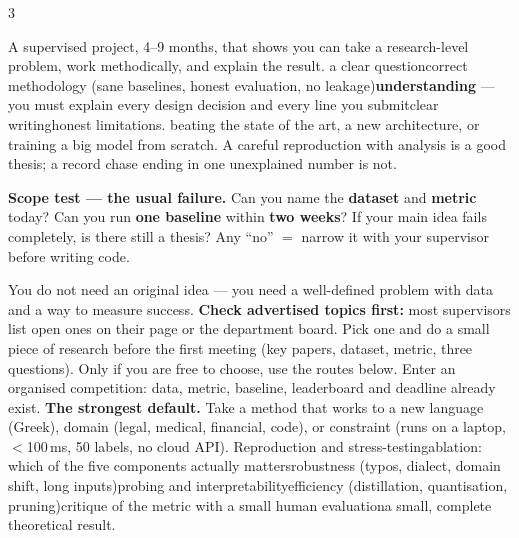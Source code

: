 \documentclass[10pt,a4paper]{article}
\begin{document}
\vspace{2pt}
\begin{multicols}{3}
\raggedcolumns
\raggedright

A supervised project, 4--9 months, that shows you can take a research-level
problem, work methodically, and explain the result.
a clear question\dt correct methodology (sane
baselines, honest evaluation, no leakage)\dt \textbf{understanding} --- you
must explain every design decision and every line you submit\dt clear
writing\dt honest limitations.
beating the state of the art, a new architecture, or
training a big model from scratch. A careful reproduction with analysis is a
good thesis; a record chase ending in one unexplained number is not.
\begin{flag}
\textbf{Scope test --- the usual failure.} Can you name the \textbf{dataset}
and \textbf{metric} today? Can you run \textbf{one baseline} within
\textbf{two weeks}? If your main idea fails completely, is there still a
thesis? Any ``no'' $=$ narrow it with your supervisor before writing code.
\end{flag}

You do not need an original idea --- you need a well-defined problem with data
and a way to measure success. \textbf{Check advertised topics first:} most
supervisors list open ones on their page or the department board. Pick one and
do a small piece of research before the first meeting (key papers, dataset,
metric, three questions). Only if you are free to choose, use the routes below.
Enter an organised competition: data, metric,
baseline, leaderboard and deadline already exist. \textbf{The strongest
default.}
Take a method that works to a new language (Greek),
domain (legal, medical, financial, code), or constraint (runs on a laptop,
$<$100\,ms, 50 labels, no cloud API).
Reproduction and stress-testing\dt ablation: which of
the five components actually matters\dt robustness (typos, dialect, domain
shift, long inputs)\dt probing and interpretability\dt efficiency
(distillation, quantisation, pruning)\dt critique of the metric with a small
human evaluation\dt a small, complete theoretical result.


\end{multicols}
\end{document}

